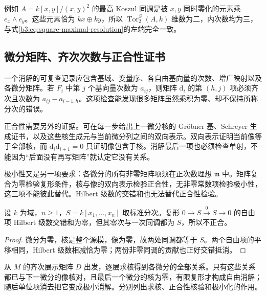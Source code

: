 \ProseParagraphBreak
例如 \(A=k[x,y]/(x,y)^2\) 的最高 Koszul 同调是被 \(x,y\) 同时零化的元素乘 \(e_x\wedge e_y\)。这些元素恰为 \(kx\oplus ky\)，所以 \(\operatorname{Tor}_2^S(A,k)\) 维数为二，内次数均为三，与式\eqref{b3:eq:square-maximal-resolution}的左端完全一致。

\subsection{微分矩阵、齐次次数与正合性证书}
\label{b3:subsec:2105:03}

一个消解的可复查记录应包含基域、变量序、各自由基向量的次数、增广映射以及各微分矩阵。若 \(F_i\) 中第 \(j\) 个基向量次数为 \(a_{ij}\)，则矩阵 \(\mathrm{d}_i\) 的第 \((h,j)\) 项必须齐次且次数为 \(a_{ij}-a_{i-1,h}\)。这项检查能发现很多矩阵虽然乘积为零、却不保持所称分次的错误。

\ProseParagraphBreak
正合性需要另外的证据。可在每一步给出上一微分核的 Gröbner 基、Schreyer 生成证书，以及这些核生成元与当前微分列之间的双向表示。双向表示证明当前像等于全部核，而 \(\mathrm{d}_i\mathrm{d}_{i+1}=0\) 只证明像包含于核。消解最后一项也必须检查单射，不能因为“后面没有再写矩阵”就认定它没有关系。

\ProseParagraphBreak
极小性又是另一项要求：各微分的所有非零矩阵项须在正次数理想 \(\mathfrak m\) 中。矩阵复合为零检验复形条件，核与像的双向表示检验正合性，无非零常数项检验极小性，这三项不能彼此替代。Hilbert 级数的交错和也无法替代正合性检验。

\begin{example}\label{b3:exm:hilbert-euler-not-exact}
	设 \(k\) 为域，\(n\ge1\)，\(S=k[x_1,\ldots,x_n]\) 取标准分次。复形 \(0\to S\xrightarrow{0}S\to0\) 的自由项 Hilbert 级数交错和为零，但其零次与一次同调都为 \(S\)，所以不正合。
\end{example}
\begin{proof}
	微分为零，核是整个源模，像为零，故两处同调都等于 \(S\)。两个自由项的平移相同，Hilbert 级数相减恰为零；两份非零同调的贡献也正好交错抵消。
\end{proof}

\ProseParagraphBreak
从 \(M\) 的齐次展示矩阵 \(D\) 出发，逐层求核得到各微分的全部关系。只有这些关系都已与下一微分的像核对，且最后一个微分的核为零，有限复形才构成自由消解；随后单位项消去把它变成极小消解。分别列出求核、正合性核验和极小化的作用。


